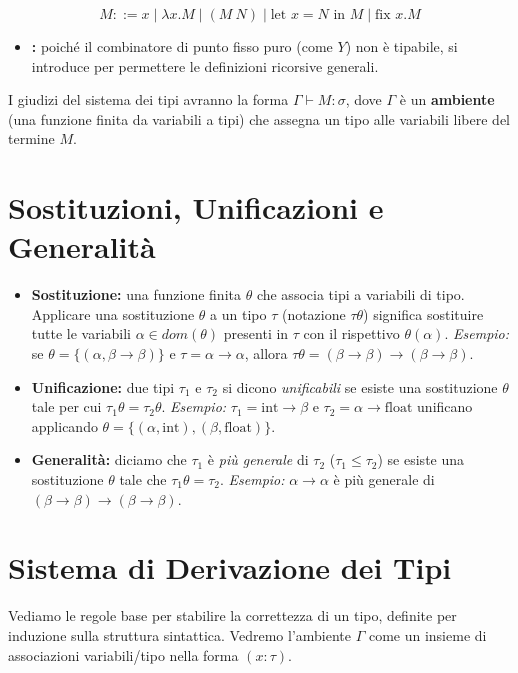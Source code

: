 $$ M ::= x \mid \lambda x.M \mid (M \ N) \mid \text{let } x=N \text{ in } M \mid \text{fix } x.M $$ 

\begin{itemize}
    \item \textbf{:} poiché il combinatore di punto fisso puro (come $Y$) non è tipabile, si introduce  per permettere le definizioni ricorsive generali. 
\end{itemize}

I giudizi del sistema dei tipi avranno la forma $\Gamma \vdash M : \sigma$, dove $\Gamma$ è un \textbf{ambiente} (una funzione finita da variabili a tipi) che assegna un tipo alle variabili libere del termine $M$. 

\section{Sostituzioni, Unificazioni e Generalità}
\begin{itemize}
    \item \textbf{Sostituzione:} una funzione finita $\theta$ che associa tipi a variabili di tipo. 
    Applicare una sostituzione $\theta$ a un tipo $\tau$ (notazione $\tau\theta$) significa sostituire tutte le variabili $\alpha \in dom(\theta)$ presenti in $\tau$ con il rispettivo $\theta(\alpha)$. 
    \subitem \textit{Esempio:} se $\theta = \{(\alpha, \beta \rightarrow \beta)\}$ e $\tau = \alpha \rightarrow \alpha$, allora $\tau\theta = (\beta \rightarrow \beta) \rightarrow (\beta \rightarrow \beta)$. 
    
    \item \textbf{Unificazione:} due tipi $\tau_1$ e $\tau_2$ si dicono \textit{unificabili} se esiste una sostituzione $\theta$ tale per cui $\tau_1\theta = \tau_2\theta$. 
    \subitem \textit{Esempio:} $\tau_1 = \text{int} \rightarrow \beta$ e $\tau_2 = \alpha \rightarrow \text{float}$ unificano applicando $\theta = \{(\alpha, \text{int}), (\beta, \text{float})\}$. 
    
    \item \textbf{Generalità:} diciamo che $\tau_1$ è \textit{più generale} di $\tau_2$ ($\tau_1 \le \tau_2$) se esiste una sostituzione $\theta$ tale che $\tau_1\theta = \tau_2$. 
    \subitem \textit{Esempio:} $\alpha \rightarrow \alpha$ è più generale di $(\beta \rightarrow \beta) \rightarrow (\beta \rightarrow \beta)$. 
\end{itemize}

\section{Sistema di Derivazione dei Tipi}
Vediamo le regole base per stabilire la correttezza di un tipo, definite per induzione sulla struttura sintattica. 
Vedremo l'ambiente $\Gamma$ come un insieme di associazioni variabili/tipo nella forma $(x : \tau)$. 

